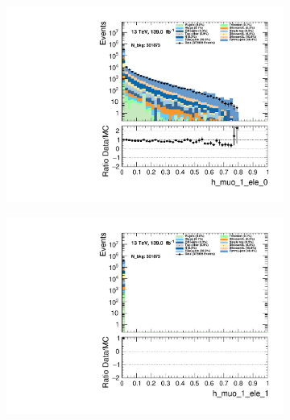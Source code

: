 \begin{figure}
\begin{subfigure}{.49\textwidth}
        \includegraphics[width=\textwidth]{Figures/MC_Data_comp/h_muo_1_ele_0.pdf}
        \caption{ }
        \label{fig:fep}
    \end{subfigure}
    \hfill
    \begin{subfigure}{.49\textwidth}
        \includegraphics[width=\textwidth]{Figures/MC_Data_comp/h_muo_1_ele_1.pdf}
        \caption{ }
        \label{fig:fe}
    \end{subfigure}
    \hfill       
    \caption{}
    \label{fig:t}
\end{figure}

